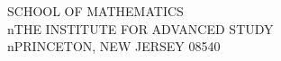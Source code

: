\documentclass[12pt,a4paper]{article}
\theoremstyle{plain}
\theoremstyle{definition}
\begin{document}
\vspace{1cm}
\begin{flushleft}
SCHOOL OF MATHEMATICS \\nTHE INSTITUTE FOR ADVANCED STUDY \\nPRINCETON, NEW JERSEY 08540
\end{flushleft}
\end{document}
